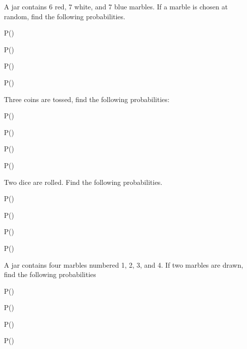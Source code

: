 A jar contains 6 red, 7 white, and 7 blue marbles. If a marble is chosen at random, find the following
probabilities.

\begin{puzzle}
    P()
\end{puzzle}

\begin{puzzle}
    P()
\end{puzzle}

\begin{puzzle}
    P()
\end{puzzle}

\begin{puzzle}
    P()
\end{puzzle}




Three coins are tossed, find the following probabilities:

\begin{puzzle}
    P()
\end{puzzle}

\begin{puzzle}
    P()
\end{puzzle}

\begin{puzzle}
    P()
\end{puzzle}

\begin{puzzle}
    P()
\end{puzzle}

Two dice are rolled. Find the following probabilities.

\begin{puzzle}
    P()
\end{puzzle}

\begin{puzzle}
    P()
\end{puzzle}

\begin{puzzle}
    P()
\end{puzzle}

\begin{puzzle}
    P()
\end{puzzle}

A jar contains four marbles numbered 1, 2, 3, and 4. If two marbles are drawn, find the following probabilities

\begin{puzzle}
    P()
\end{puzzle}

\begin{puzzle}
    P()
\end{puzzle}

\begin{puzzle}
    P()
\end{puzzle}

\begin{puzzle}
    P()
\end{puzzle}
